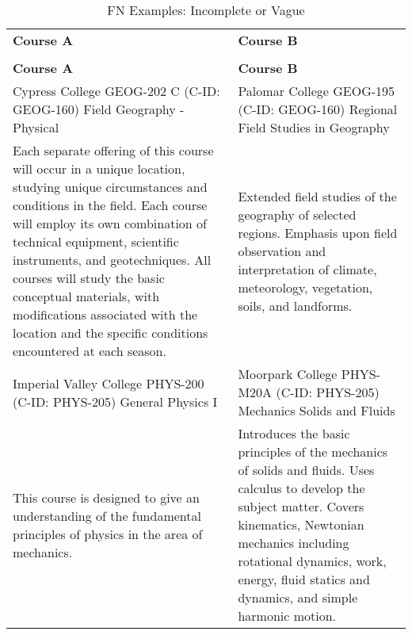 \begin{longtable}{ >{\baselineskip=12pt}p{}  >{\baselineskip=12pt}p{} }
\captionsetup{skip=5pt}
\caption{FN Examples: Incomplete or Vague}\label{tab:fn_incomplete}\\
\bottomrule\toprule
\textbf{Course A} & \textbf{Course B} \\
\bottomrule\toprule
\endfirsthead
\caption[]{FN Examples: Incomplete or Vague}\\
\bottomrule\toprule
\textbf{Course A} & \textbf{Course B} \\
\bottomrule\toprule
\endhead
Cypress College \newline GEOG-202 C (C-ID: GEOG-160) \newline Field Geography - Physical & Palomar College \newline GEOG-195 (C-ID: GEOG-160) \newline Regional Field Studies in Geography \\
\midrule
Each separate offering of this course will occur in a unique location, studying unique circumstances and conditions in the field. Each course will employ its own combination of technical equipment, scientific instruments, and geotechniques. All courses will study the basic conceptual materials, with modifications associated with the location and the specific conditions encountered at each season. & Extended field studies of the geography of selected regions. Emphasis upon field observation and interpretation of climate, meteorology, vegetation, soils, and landforms. \\
\bottomrule\toprule
Imperial Valley College \newline PHYS-200 (C-ID: PHYS-205) \newline General Physics I & Moorpark College \newline PHYS-M20A (C-ID: PHYS-205) \newline Mechanics Solids and Fluids \\
\midrule
This course is designed to give an understanding of the fundamental principles of physics in the area of mechanics. & Introduces the basic principles of the mechanics of solids and fluids. Uses calculus to develop the subject matter. Covers kinematics, Newtonian mechanics including rotational dynamics, work, energy, fluid statics and dynamics, and simple harmonic motion. \\
\bottomrule\toprule
\end{longtable}

